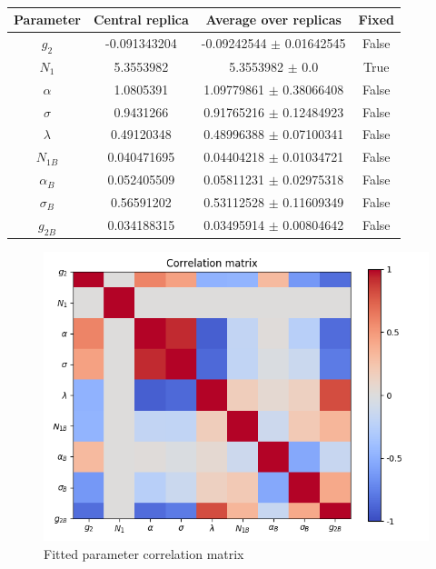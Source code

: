 \documentclass[
]{article}
\begin{document}
\begin{table}[h]

\centering

\begin{tabular}{|c|c|c|c|} \hline

\textbf{Parameter} & \textbf{Central replica} & \textbf{Average over
replicas} & \textbf{Fixed} \\ \hline

\(g_2\) & -0.091343204 & -0.09242544 \(\pm\)
0.01642545 & False \\ \hline
\(N_1\) & 5.3553982 & 5.3553982 \(\pm\) 0.0 & True \\ \hline
\(\alpha\) & 1.0805391 & 1.09779861 \(\pm\) 0.38066408 & False \\ \hline
\(\sigma\) & 0.9431266 & 0.91765216 \(\pm\) 0.12484923 & False \\ \hline
\(\lambda\) & 0.49120348 & 0.48996388 \(\pm\)
0.07100341 & False \\ \hline
\(N_{1B}\) & 0.040471695 & 0.04404218 \(\pm\)
0.01034721 & False \\ \hline
\(\alpha_B\) & 0.052405509 & 0.05811231 \(\pm\)
0.02975318 & False \\ \hline
\(\sigma_B\) & 0.56591202 & 0.53112528 \(\pm\)
0.11609349 & False \\ \hline
\(g_{2B}\) & 0.034188315 & 0.03495914 \(\pm\)
0.00804642 & False \\ \hline

\end{tabular}

\caption{}

\end{table}

\begin{figure}
\centering
\includegraphics{pngplots/CorrelationMatrix.png}
\caption{Fitted parameter correlation matrix}
\end{figure}
\end{document}

